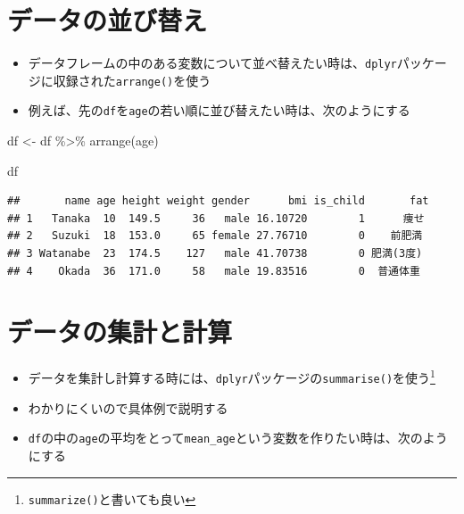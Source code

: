 \documentclass[
]{book}
\newenvironment{Shaded}{\begin{snugshade}}{\end{snugshade}}
\newcommand{\FunctionTok}[1]{\textcolor[rgb]{0.00,0.00,0.00}{#1}}
\newcommand{\NormalTok}[1]{#1}
\newcommand{\OtherTok}[1]{\textcolor[rgb]{0.56,0.35,0.01}{#1}}
\newcommand{\SpecialCharTok}[1]{\textcolor[rgb]{0.00,0.00,0.00}{#1}}
\providecommand{\tightlist}{%
  \setlength{\itemsep}{0pt}\setlength{\parskip}{0pt}}
\begin{document}
\hypertarget{ux30c7ux30fcux30bfux306eux4e26ux3073ux66ffux3048}{%
\section{データの並び替え}\label{ux30c7ux30fcux30bfux306eux4e26ux3073ux66ffux3048}}

\begin{itemize}
\tightlist
\item
  データフレームの中のある変数について並べ替えたい時は、\texttt{dplyr}パッケージに収録された\texttt{arrange()}を使う
\item
  例えば、先の\texttt{df}を\texttt{age}の若い順に並び替えたい時は、次のようにする
\end{itemize}

\begin{Shaded}
\begin{Highlighting}[]
\NormalTok{df }\OtherTok{\textless{}{-}}\NormalTok{ df }\SpecialCharTok{\%\textgreater{}\%} \FunctionTok{arrange}\NormalTok{(age)}

\NormalTok{df}
\end{Highlighting}
\end{Shaded}

\begin{verbatim}
##       name age height weight gender      bmi is_child       fat
## 1   Tanaka  10  149.5     36   male 16.10720        1      痩せ
## 2   Suzuki  18  153.0     65 female 27.76710        0    前肥満
## 3 Watanabe  23  174.5    127   male 41.70738        0 肥満(3度)
## 4    Okada  36  171.0     58   male 19.83516        0  普通体重
\end{verbatim}

\hypertarget{ux30c7ux30fcux30bfux306eux96c6ux8a08ux3068ux8a08ux7b97}{%
\section{データの集計と計算}\label{ux30c7ux30fcux30bfux306eux96c6ux8a08ux3068ux8a08ux7b97}}

\begin{itemize}
\tightlist
\item
  データを集計し計算する時には、\texttt{dplyr}パッケージの\texttt{summarise()}を使う\footnote{\texttt{summarize()}と書いても良い}
\item
  わかりにくいので具体例で説明する
\item
  \texttt{df}の中の\texttt{age}の平均をとって\texttt{mean\_age}という変数を作りたい時は、次のようにする
\end{itemize}
\end{document}
